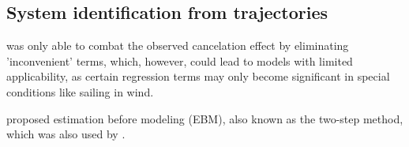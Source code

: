 \subsection{System identification from trajectories} \label{sec:literature_system_identification}

\textcite{abkowitz_measurement_1980} was only able to combat the observed cancelation effect by eliminating 'inconvenient' terms, which, however, could lead to models with limited applicability, as certain regression terms may only become significant in special conditions like sailing in wind.



\textcite{yoon_identification_2003} proposed estimation before modeling (EBM), also known as the two-step method, which was also used by \textcite{sutulo_algorithm_2014}. 